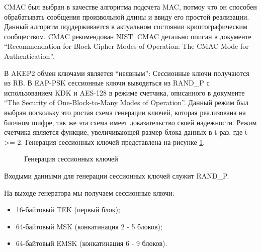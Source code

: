 CMAC был выбран в качестве алгоритма подсчета MAC, потмоу что он способен обрабатывать сообщения произвольной длины и ввиду его простой реализации. Данный алгоритм поддерживается в актуальном состоянии криптографическим сообществом. CMAC рекомендован NIST. CMAC детально описан в документе ``Recommendation for Block Cipher Modes of Operation: The CMAC Mode for Authentication''.

В AKEP2 обмен ключами является ``неявным'': Сессионные ключи получаются из RB. В EAP-PSK сессионные ключи выводяться из RAND\_P с использованием KDK и AES-128 в режиме счетчика, описанного в документе ``The Security of One-Block-to-Many Modes of Operation''. Данный режим был выбран поскольку это ростая схема генерации ключей, которая реализована на блочном шифре, так же эта схема имеет доказательство своей надежности. Режим счетчика является функцие, увеличивающей размер блока данных в t раз, где t >= 2. Генерация сессионных ключей представлена на рисунке \ref{img:sk_derivation}.

\begin{figure}[h!]
\caption{Генерация сессионных ключей}
\label{img:sk_derivation}
\end{figure}

Входыми данными для генерации сессионных ключей служит RAND\_P.

На выходе генератора мы получаем сессионные ключи:

\begin{itemize}
\item 16-байтовый TEK (первый блок);
\item 64-байтовый MSK (конкатинация 2 - 5 блоков);
\item 64-байтовый EMSK (конкатинация 6 - 9 блоков).
\end{itemize}

